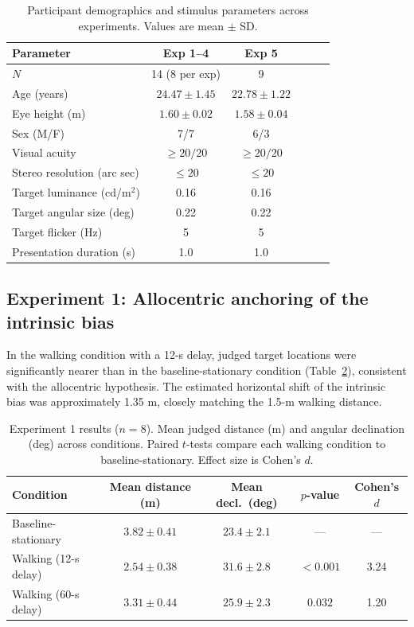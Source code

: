 \documentclass[11pt]{article}
\begin{document}
\begin{table}[H]
\centering
\caption{Participant demographics and stimulus parameters across experiments. Values are mean $\pm$ SD.}
\label{tab:demographics}
\begin{tabular}{lccccc}
\toprule
\textbf{Parameter} & \textbf{Exp 1--4} & \textbf{Exp 5} \\
\midrule
$N$ & 14 (8 per exp) & 9 \\
Age (years) & $24.47 \pm 1.45$ & $22.78 \pm 1.22$ \\
Eye height (m) & $1.60 \pm 0.02$ & $1.58 \pm 0.04$ \\
Sex (M/F) & 7/7 & 6/3 \\
Visual acuity & $\geq 20/20$ & $\geq 20/20$ \\
Stereo resolution (arc sec) & $\leq 20$ & $\leq 20$ \\
Target luminance (cd/m$^2$) & 0.16 & 0.16 \\
Target angular size (deg) & 0.22 & 0.22 \\
Target flicker (Hz) & 5 & 5 \\
Presentation duration (s) & 1.0 & 1.0 \\
\bottomrule
\end{tabular}
\end{table}

\subsection{Experiment 1: Allocentric anchoring of the intrinsic bias}

In the walking condition with a 12-s delay, judged target locations were significantly nearer than in the baseline-stationary condition (Table~\ref{tab:exp1}), consistent with the allocentric hypothesis. The estimated horizontal shift of the intrinsic bias was approximately 1.35 m, closely matching the 1.5-m walking distance.

\begin{table}[H]
\centering
\caption{Experiment 1 results ($n = 8$). Mean judged distance (m) and angular declination (deg) across conditions. Paired $t$-tests compare each walking condition to baseline-stationary. Effect size is Cohen's $d$.}
\label{tab:exp1}
\begin{tabular}{lcccc}
\toprule
\textbf{Condition} & \textbf{Mean distance (m)} & \textbf{Mean decl.\ (deg)} & \textbf{$p$-value} & \textbf{Cohen's $d$} \\
\midrule
Baseline-stationary & $3.82 \pm 0.41$ & $23.4 \pm 2.1$ & --- & --- \\
Walking (12-s delay) & $2.54 \pm 0.38$ & $31.6 \pm 2.8$ & $< 0.001$ & 3.24 \\
Walking (60-s delay) & $3.31 \pm 0.44$ & $25.9 \pm 2.3$ & $0.032$ & 1.20 \\
\bottomrule
\end{tabular}
\end{table}
\end{document}
